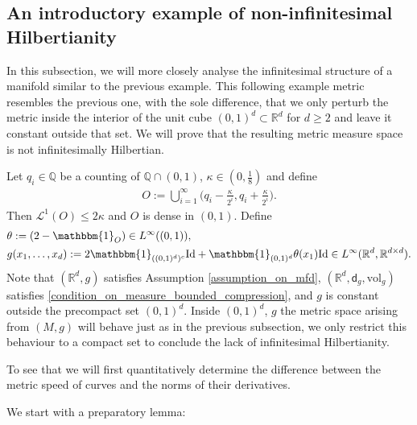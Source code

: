 \documentclass[a4paper,10pt]{article}
\numberwithin{equation}{section}
\newcommand{\R}{\mathbb{R}}
\newcommand{\Q}{\mathbb{Q}}
\newcommand{\vol}{\mathrm{vol}}
\newcommand{\sfd}{\mathsf d}
\begin{document}
\subsection{An introductory example of non-infinitesimal Hilbertianity}\label{subsec:first_counter_inf_hilbertian}
In this subsection, we will more closely analyse the infinitesimal structure of a manifold similar to the previous example. 
This following example metric resembles the previous one, with the sole difference, that we only perturb the metric inside the interior of the unit cube $(0,1)^d\subset\R^d$ for $d \geq 2$ and leave it constant outside that set. We will prove that the resulting metric measure space is not infinitesimally Hilbertian.

Let $q_i \in \Q$ be a counting of $\Q \cap (0,1)$,  $\kappa \in (0, \frac{1}{8})$ and define 
\begin{align}\label{ex1_rational_cover_infH}
    O:= \bigcup_{i=1}^\infty \Big(q_i-\frac{\kappa}{2^i}, q_i + \frac{\kappa}{2^i}\Big).
\end{align}
Then $\mathcal{L}^1(O) \leq 2\kappa$ and $O$ is dense in $(0,1)$. Define
\begin{align*}
    &\theta:= (2 -\mathbbm{1}_{O}) \in L^\infty((0,1)), \\
    &g(x_1, \ldots, x_d):= 2\mathbbm{1}_{((0,1)^d)^c}\mathrm{Id} + \mathbbm{1}_{(0,1)^d}\theta(x_1)\mathrm{Id} \in L^\infty(\R^d, \R^{d\times d}).
\end{align*}
Note that $(\R^d, g)$ satisfies Assumption \ref{assumption_on_mfd}, $(\R^d, \sfd_g, \vol_g)$ satisfies \eqref{condition_on_measure_bounded_compression}, and $g$ is constant outside the precompact set $(0,1)^d$. Inside $(0,1)^d$, $g$ the metric space arising from $(M,g)$ will behave just as in the previous subsection, we only restrict this behaviour to a compact set to conclude the lack of infinitesimal Hilbertianity. 

To see that we will first quantitatively determine the difference between the metric speed of curves and the norms of their derivatives.

We start with a preparatory lemma:
\smallskip
\end{document}
